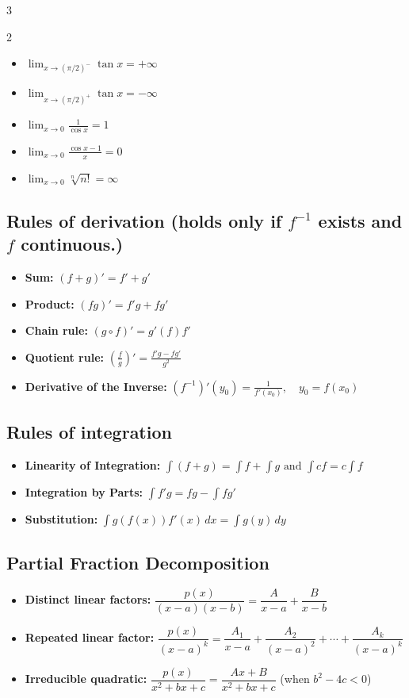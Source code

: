 \begin{multicols}{3}
\begin{multicols}{2}
\begin{itemize}[noitemsep, topsep=0pt, leftmargin=*]
\item $\lim_{x\to(\pi/2)^-}\tan x=+\infty$
\item $\lim_{x\to(\pi/2)^+}\tan x=-\infty$

\item $\lim_{x\to0}\frac1{\cos x}=1$
\item $\lim_{x\to0}\frac{\cos x-1}{x}=0$
\item $\lim_{x\to0} \sqrt[n]{n!} = \infty$
\end{itemize}
\end{multicols}

\subsection*{Rules of derivation (holds only if $f^{-1}$ exists and $f$ continuous.)}
\begin{itemize}[noitemsep, topsep=0pt, leftmargin=*]
\item \textbf{Sum:}
\(
(f+g)'=f'+g'
\)
\item \textbf{Product:}
\(
(fg)'=f'g+fg'
\)
\item \textbf{Chain rule:}
\(
(g\circ f)'=g'(f)f'
\)
\item \textbf{Quotient rule:}
\(
\left(\frac fg\right)'=\frac{f'g-fg'}{g^2}
\)
\item \textbf{Derivative of the Inverse:}
\(
(f^{-1})'(y_0)=\frac1{f'(x_0)},\quad y_0=f(x_0)
\)
\end{itemize}


\subsection*{Rules of integration}
\begin{itemize}[noitemsep, topsep=0pt, leftmargin=*]
\item \textbf{Linearity of Integration:}
\(
\int(f+g)=\int f+\int g \text{ and }
\int cf=c\int f
\)
\item \textbf{Integration by Parts:}
\(
\int f'g=fg-\int fg'
\)
\item \textbf{Substitution:}
\(
\int g(f(x))f'(x)\,dx=\int g(y)\,dy
\)
\end{itemize}

\subsection*{Partial Fraction Decomposition}
\begin{itemize}[noitemsep, topsep=0pt, leftmargin=*]
\item \textbf{Distinct linear factors:} $\dfrac{p(x)}{(x-a)(x-b)}=\dfrac{A}{x-a}+\dfrac{B}{x-b}$
\item \textbf{Repeated linear factor:} $\dfrac{p(x)}{(x-a)^k}=\dfrac{A_1}{x-a}+\dfrac{A_2}{(x-a)^2}+\cdots+\dfrac{A_k}{(x-a)^k}$
\item \textbf{Irreducible quadratic:} $\dfrac{p(x)}{x^2+bx+c}=\dfrac{Ax+B}{x^2+bx+c}$ (when $b^2-4c<0$)
\end{itemize}


\end{multicols}
